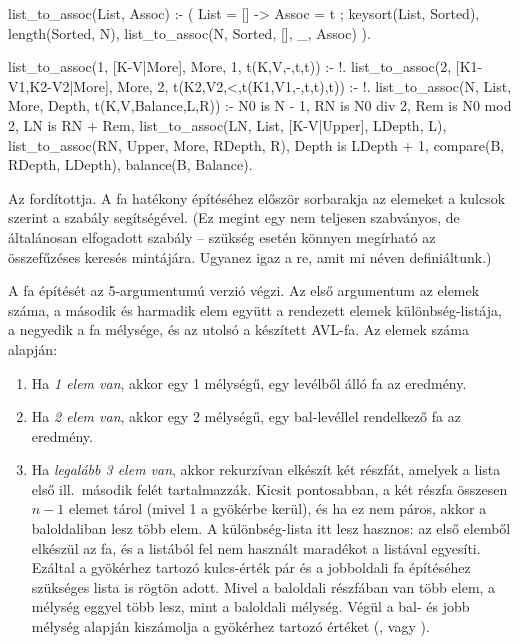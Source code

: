 \begin{program*}
list_to_assoc(List, Assoc) :-
    (  List = [] -> Assoc = t
    ;  keysort(List, Sorted),
       length(Sorted, N),
       list_to_assoc(N, Sorted, [], _, Assoc)
    ).

list_to_assoc(1, [K-V|More], More,
              1, t(K,V,-,t,t)) :- !.
list_to_assoc(2, [K1-V1,K2-V2|More], More,
              2, t(K2,V2,<,t(K1,V1,-,t,t),t)) :- !.
list_to_assoc(N, List, More,
              Depth, t(K,V,Balance,L,R)) :-
    N0 is N - 1,
    RN is N0 div 2,
    Rem is N0 mod 2,
    LN is RN + Rem,
    list_to_assoc(LN, List, [K-V|Upper], LDepth, L),
    list_to_assoc(RN, Upper, More, RDepth, R),
    Depth is LDepth + 1,
    compare(B, RDepth, LDepth), balance(B, Balance).
\end{program*}
Az  fordítottja. A fa hatékony
építéséhez először sorbarakja az elemeket a kulcsok
szerint a  szabály segítségével. (Ez
megint egy nem teljesen szabványos, de általánosan
elfogadott szabály -- szükség esetén könnyen
megírható az összefűzéses keresés mintájára. Ugyanez
igaz a re, amit mi  néven
definiáltunk.)

A fa építését az 5-argumentumú verzió végzi. Az első
argumentum az elemek száma, a második és harmadik
elem együtt a rendezett elemek különbség-listája, a
negyedik a fa mélysége, és az utolsó a készített
AVL-fa. Az elemek száma alapján:
\begin{enumerate}
\item Ha \emph{1 elem van}, akkor egy 1 mélységű,
  egy levélből álló fa az eredmény.
\item Ha \emph{2 elem van}, akkor egy 2 mélységű,
  egy bal-levéllel rendelkező fa az eredmény.
\item Ha \emph{legalább 3 elem van}, akkor
  rekurzívan elkészít két részfát, amelyek a lista
  első ill.~második felét tartalmazzák. Kicsit
  pontosabban, a két részfa összesen $n-1$
  elemet tárol (mivel 1 a gyökérbe kerül), és ha ez
  nem páros, akkor a baloldaliban lesz több elem. A
  különbség-lista itt lesz hasznos: az első 
  elemből elkészül az  fa, és a 
  listából fel nem használt maradékot a
  \pr{[K-V|Upper]} listával egyesíti. Ezáltal a
  gyökérhez tartozó kulcs-érték pár és a jobboldali
  fa építéséhez szükséges  lista is rögtön
  adott. Mivel a baloldali részfában van több elem,
  a mélység eggyel több lesz, mint a baloldali
  mélység. Végül a bal- és jobb mélység alapján
  kiszámolja a gyökérhez tartozó  értéket
  (\pr{<}, \pr{-} vagy \pr{>}).
\end{enumerate}

